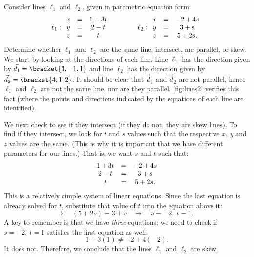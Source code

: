 \begin{example}\label{ex_lines2}%
Consider lines $\ell_1$ and $\ell_2$, given in parametric equation form:
\[
\ell_1: \begin{array}{ c c c } x&=&1+3t \\ y&=&2-t\\z&=&t\end{array}
\qquad\qquad
\ell_2: \begin{array}{ c c c } x&=&-2+4s\\y&=&3+s\\z&=&5+2s.\end{array}
\]
Determine whether $\ell_1$ and $\ell_2$ are the same line, intersect, are parallel, or skew.
\solution
We start by looking at the directions of each line. Line $\ell_1$ has the direction given by $\vec d_1=\bracket{3,-1,1}$ and line $\ell_2$ has the direction given by $\vec d_2 =\bracket{4,1,2}$. It should be clear that $\vec d_1$ and $\vec d_2$ are not parallel, hence $\ell_1$ and $\ell_2$ are not the same line, nor are they parallel. \autoref{fig:lines2} verifies this fact (where the points and directions indicated by the equations of each line are identified).


We next check to see if they intersect (if they do not, they are skew lines). To find if they intersect, we look for $t$ and $s$ values such that the respective $x$, $y$ and $z$ values are the same. (This is why it is important that we have different parameters for our lines.) That is, we want $s$ and $t$ such that:
\[
\begin{array}{ c c c }
1+3t &=&-2+4s\\
2-t&=&3+s\\
t&=&5+2s.\end{array}
\]
This is a relatively simple system of linear equations. Since the last equation is already solved for $t$, substitute that value of $t$ into the equation above it:
\[2-(5+2s) = 3+s \quad \Rightarrow \quad s=-2,\ t=1.\]
A key to remember is that we have \emph{three} equations; we need to check if $s=-2,\ t=1$ satisfies the first equation as well:
\[1+3(1) \neq -2+4(-2).\]
It does not. Therefore, we conclude that the lines $\ell_1$ and $\ell_2$ are skew.
\end{example}

